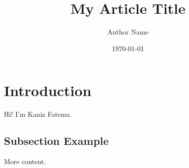 \documentclass{article}
\title{My Article Title}
\author{Author Name}
\date{\today}
\begin{document}
\maketitle

\section{Introduction}
Hi! I'm Kaniz Fatema. 

\subsection{Subsection Example}
More content.
\end{document}
